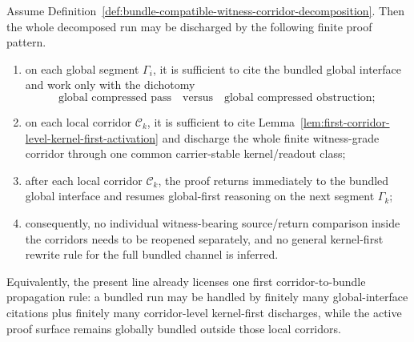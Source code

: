 \begin{proposition}
\label{prop:first-corridor-to-bundle-propagation-principle}
Assume Definition~\ref{def:bundle-compatible-witness-corridor-decomposition}. Then the whole decomposed run may be discharged by the following finite proof pattern.
\begin{enumerate}[leftmargin=2em,label=(\roman*)]
\item on each global segment $\Gamma_i$, it is sufficient to cite the bundled global interface and work only with the dichotomy
\[
\text{global compressed pass}
\quad\text{versus}\quad
\text{global compressed obstruction};
\]
\item on each local corridor $\mathcal C_k$, it is sufficient to cite Lemma~\ref{lem:first-corridor-level-kernel-first-activation} and discharge the whole finite witness-grade corridor through one common carrier-stable kernel/readout class;
\item after each local corridor $\mathcal C_k$, the proof returns immediately to the bundled global interface and resumes global-first reasoning on the next segment $\Gamma_k$;
\item consequently, no individual witness-bearing source/return comparison inside the corridors needs to be reopened separately, and no general kernel-first rewrite rule for the full bundled channel is inferred.
\end{enumerate}
Equivalently, the present line already licenses one first corridor-to-bundle propagation rule: a bundled run may be handled by finitely many global-interface citations plus finitely many corridor-level kernel-first discharges, while the active proof surface remains globally bundled outside those local corridors.
\end{proposition}

